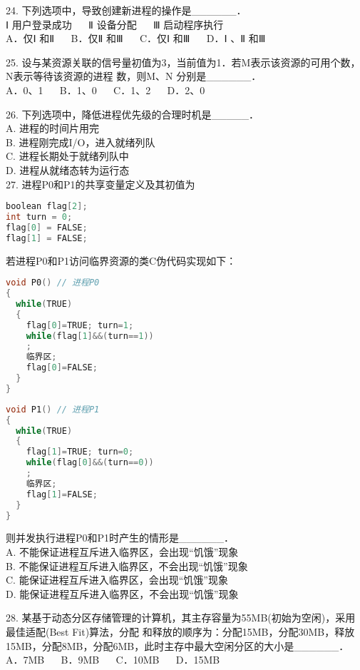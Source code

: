 24. 下列选项中，导致创建新进程的操作是______． \\
Ⅰ 用户登录成功 $\quad$ Ⅱ 设备分配 $\quad$ Ⅲ 启动程序执行 \\
A．仅Ⅰ 和Ⅱ $\quad$ B．仅Ⅱ 和Ⅲ $\quad$ C．仅Ⅰ 和Ⅲ $\quad$ D．Ⅰ 、Ⅱ 和Ⅲ

25. 设与某资源关联的信号量初值为3，当前值为1．若M表示该资源的可用个数，N表示等待该资源的进程
数，则M、N 分别是______． \\
A．0、1 $\quad$ B．1、0 $\quad$ C．1、2 $\quad$ D．2、0

26. 下列选项中，降低进程优先级的合理时机是_____． \\
A. 进程的时间片用完 \\
B. 进程刚完成I/O，进入就绪列队 \\
C. 进程长期处于就绪列队中 \\
D. 进程从就绪态转为运行态 \\

27. 进程P0和P1的共享变量定义及其初值为 \\
\begin{lstlisting}[language=cpp]
boolean flag[2];
int turn = 0;
flag[0] = FALSE;
flag[1] = FALSE;
\end{lstlisting}
若进程P0和P1访问临界资源的类C伪代码实现如下：
\begin{lstlisting}[language=cpp]
void P0() // 进程P0
{
  while(TRUE)
  {
    flag[0]=TRUE; turn=1;
    while(flag[1]&&(turn==1))
    ;
    临界区;
    flag[0]=FALSE;
  }
}
\end{lstlisting}

\begin{lstlisting}[language=cpp]
void P1() // 进程P1
{
  while(TRUE)
  {
    flag[1]=TRUE; turn=0;
    while(flag[0]&&(turn==0))
    ;
    临界区;
    flag[1]=FALSE;
  }
}
\end{lstlisting}
则并发执行进程P0和P1时产生的情形是______．  \\
A. 不能保证进程互斥进入临界区，会出现“饥饿”现象 \\
B. 不能保证进程互斥进入临界区，不会出现“饥饿”现象 \\
C. 能保证进程互斥进入临界区，会出现“饥饿”现象 \\
D. 能保证进程互斥进入临界区，不会出现“饥饿”现象

28. 某基于动态分区存储管理的计算机，其主存容量为55MB(初始为空闲)，采用最佳适配(Best Fit)算法，分配
和释放的顺序为：分配15MB，分配30MB，释放15MB，分配8MB，分配6MB，此时主存中最大空闲分区的大小是______． \\
A．7MB $\quad$ B．9MB $\quad$ C．10MB $\quad$ D．15MB

